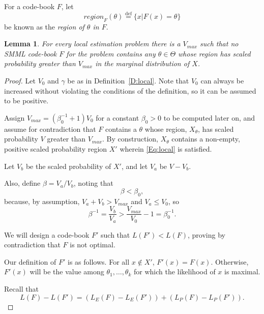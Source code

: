 \documentclass{IEEEtran}
\newcommand{\defeq}{\stackrel{\text{def}}{=}}
\newtheorem{lemma}{Lemma}
\begin{document}
For a code-book $F$, let
\[
\textit{region}_F(\theta)\defeq\{x|F(x)=\theta\}
\]
be known as the \emph{region of $\theta$ in $F$}.

\begin{lemma}\label{L:Vmax}
For every local estimation problem there is a $V_{\textit{max}}$ such that no
SMML code-book $F$ for the problem contains any
$\theta\in\Theta$ whose region has scaled probability greater than
$V_{\textit{max}}$ in the marginal distribution of $X$.
\end{lemma}

\begin{proof}
Let $V_0$ and $\gamma$ be as in Definition~\ref{D:local}. Note
that $V_0$ can always be increased without violating the conditions of the
definition, so it can be assumed to be positive.

Assign $V_{\textit{max}}=(\beta_0^{-1}+1)V_0$ for a constant $\beta_0>0$ to be
computed later on, and assume for contradiction that $F$
contains a $\theta$ whose region, $X_\theta$, has scaled probability $V$
greater than $V_{\textit{max}}$. By construction, $X_\theta$ contains a
non-empty, positive scaled probability region $X'$ wherein \eqref{Eq:local} is
satisfied.

Let $V_b$ be the scaled probability of $X'$, and let $V_a$ be $V-V_b$.

Also, define $\beta=V_a/V_b$, noting that
\begin{equation}\label{Eq:bb0}
\beta<\beta_0,
\end{equation}
because,
by assumption, $V_a+V_b>V_{\textit{max}}$ and $V_a\le V_0$, so
\[
\beta^{-1} = \frac{V_b}{V_a} > \frac{V_{\textit{max}}}{V_0}-1 = \beta_0^{-1}.
\]

We will design a code-book $F'$ such that $L(F')<L(F)$, proving by contradiction
that $F$ is not optimal.

Our definition of $F'$ is as follows. For all $x\notin X'$, $F'(x)=F(x)$.
Otherwise, $F'(x)$ will be the value among $\theta_1,\ldots,\theta_k$
for which the likelihood of $x$ is maximal.

Recall that
\[
L(F)-L(F')=\left(L_E(F)-L_E(F')\right)+\left(L_P(F)-L_P(F')\right).
\]


\end{proof}
\end{document}

